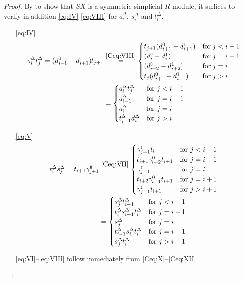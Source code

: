 \documentclass[12pt]{amsart}
\theoremstyle{plain}
\numberwithin{lemma}{\DefaultNumberTheoremWithin}
\numberwithin{claim}{\DefaultNumberTheoremWithin}
\numberwithin{theorem}{\DefaultNumberTheoremWithin}
\numberwithin{corollary}{\DefaultNumberTheoremWithin}
\numberwithin{proposition}{\DefaultNumberTheoremWithin}
\numberwithin{conjecture}{\DefaultNumberTheoremWithin}
\theoremstyle{definition}
\theoremstyle{definition}
\numberwithin{question}{\DefaultNumberTheoremWithin}
\theoremstyle{definition}
\numberwithin{problem}{\DefaultNumberTheoremWithin}
\theoremstyle{remark}
\numberwithin{remark}{\DefaultNumberTheoremWithin}
\theoremstyle{remark}
\numberwithin{example}{\DefaultNumberTheoremWithin}
\def\for{\textnormal{for }}
\def\Connection{\gamma}
\begin{document}
\begin{proof}
   By \cite[Theorem 4.2]{Grandis} to show that $SX$ is a symmetric simplicial $R$-module, it suffices to verify in addition \eqref{eq:IV}-\eqref{eq:VIII}
   for $d_i^ \Delta$, $s_i^ {\Delta}$ and $t_i^ \Delta$.
  \begin{itemize}
 
        \item[\eqref{eq:IV}]
        \begin{align*}
        d_i^\Delta t_j^\Delta =(d_{i+1}^0-d_{i+1}^1)t_{j+1}&\overset{\eqref{Ceq:VIII}}{=} \begin{cases}
    t_{j+1} (d_{i+1}^0-d_{i+1}^1) & \for j<i-1\\
    (d_{i}^0-d_{i}^1) & \for j=i-1\\
    (d_{i+2}^0-d_{i+2}^1) & \for j=i\\
    t_{j} (d_{i+1}^0-d_{i+1}^1) & \for j>i
\end{cases}\\
&=\begin{cases}
    d_i^\Delta t_j^\Delta  & \for j<i-1 \\
    d_{i-1}^\Delta  & \for j=i-1\\
    d_{i}^\Delta  & \for j=i \\
    t_{j-1}^\Delta d_i^\Delta  & \for j>i
\end{cases}
    \end{align*}
    \item[\eqref{eq:V}]
    \begin{align*}
    t_i^\Delta s_j^\Delta =t_{i+1}\Connection_{j+1}^0 &\overset{\eqref{Ceq:VII}}{=}\begin{cases}
    \Connection_{j+1}^0 t_{i} & \for j<i-1\\
    t_{i+1}\Connection_{i+2}^0t_{i+1}& \for j=i-1\\
    \Connection_{j+1}^0 & \for j=i\\
    t_{i+2}\Connection_{i+1}^0t_{i+1}& \for j=i+1\\
    \Connection_{j+1}^0 t_{i+1}& \for j>i+1
\end{cases}\\&=\begin{cases}
 s_j^\Delta  t_{i-1}^\Delta  & \for j< i-1\\ 
 t_i^\Delta s_{i+1}^\Delta t_i^\Delta &\for j=i-1\\
 s_j^\Delta  &\for j=i\\
 t_{i+1}^\Delta s_i^\Delta t_i^\Delta &\for j=i+1 \\
  s_j^\Delta  t_i^\Delta  & \for j>i+1 
\end{cases} \\
\end{align*}
    \item[\eqref{eq:VI}--\eqref{eq:VIII}] follow immediately from \eqref{Ceq:X}--\eqref{Ceq:XII}
    \end{itemize}
    \end{proof}
\end{document}
